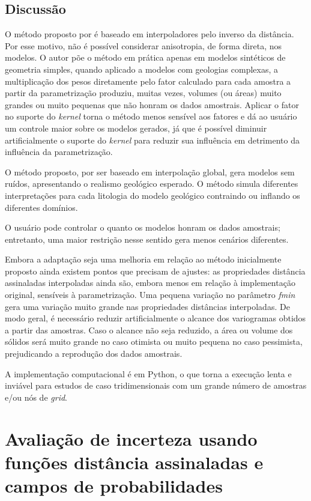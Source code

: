 \subsection{Discussão}

O método proposto por  é baseado em interpoladores pelo inverso da distância. Por esse motivo, não é possível considerar anisotropia, de forma direta, nos modelos. O autor põe o método em prática apenas em modelos sintéticos de geometria simples, quando aplicado a modelos com geologias complexas, a multiplicação dos pesos diretamente pelo fator calculado para cada amostra a partir da parametrização produziu, muitas vezes, volumes (ou áreas) muito grandes ou muito pequenas que não honram os dados amostrais. Aplicar o fator no suporte do \textit{kernel} torna o método menos sensível aos fatores e dá ao usuário um controle maior sobre os modelos gerados, já que é possível diminuir artificialmente o suporte do \textit{kernel} para reduzir sua influência em detrimento da influência da parametrização.

O método proposto, por ser baseado em interpolação global, gera modelos sem ruídos, apresentando o realismo geológico esperado. O método simula diferentes interpretações para cada litologia do modelo geológico contraindo ou inflando os diferentes domínios. 

O usuário pode controlar o quanto os modelos honram os dados amostrais; entretanto, uma maior restrição nesse sentido gera menos cenários diferentes.

Embora a adaptação seja uma melhoria em relação ao método inicialmente proposto ainda existem pontos que precisam de ajustes: as propriedades distância assinaladas interpoladas ainda são, embora menos em relação à implementação original, sensíveis à parametrização. Uma pequena variação no parâmetro \textit{fmin} gera uma variação muito grande nas propriedades distâncias interpoladas. De modo geral, é necessário reduzir artificialmente o alcance dos variogramas obtidos a partir das amostras. Caso o alcance não seja reduzido, a área ou volume dos sólidos será muito grande no caso otimista ou muito pequena no caso pessimista, prejudicando a reprodução dos dados amostrais.

A implementação computacional é em Python, o que torna a execução lenta e inviável para estudos de caso tridimensionais com um grande número de amostras e/ou nós de \textit{grid}.

\section{Avaliação de incerteza usando funções distância assinaladas e campos de probabilidades}\label{pfiels_sec}

